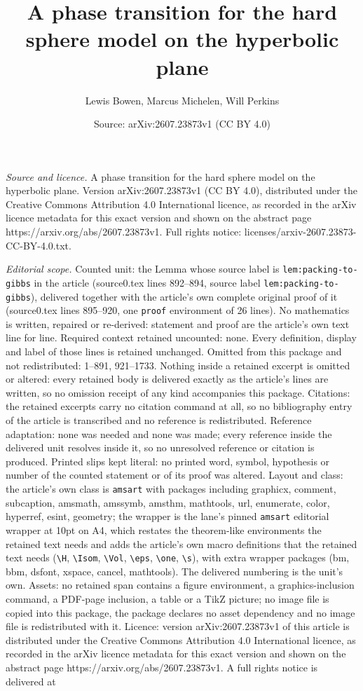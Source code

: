\documentclass[10pt,a4paper]{amsart}
\title[A phase transition for the hard sphere model on the hyperbol]{A phase transition for the hard sphere model on the hyperbolic plane}
\author{Lewis Bowen, Marcus Michelen, Will Perkins}
\date{Source: arXiv:2607.23873v1 (CC BY 4.0)}
\begin{document}
\maketitle

\noindent\emph{Source and licence.} A phase transition for the hard sphere model on the hyperbolic plane. Version arXiv:2607.23873v1 (CC BY 4.0), distributed under the Creative Commons Attribution 4.0 International licence, as recorded in the arXiv licence metadata for this exact version and shown on the abstract page https://arxiv.org/abs/2607.23873v1. Full rights notice: licenses/arxiv-2607.23873-CC-BY-4.0.txt.\par\smallskip

\noindent\textit{Editorial scope.} Counted unit: the Lemma whose source label is \texttt{lem:packing-to-gibbs} in the article (source0.tex lines 892--894, source label \texttt{lem:packing-to-gibbs}), delivered together with the article's own complete original proof of it (source0.tex lines 895--920, one \texttt{proof} environment of 26 lines). No mathematics is written, repaired or re-derived: statement and proof are the article's own text line for line. Required context retained uncounted: none. Every definition, display and label of those lines is retained unchanged. Omitted from this package and not redistributed: 1--891, 921--1733. Nothing inside a retained excerpt is omitted or altered: every retained body is delivered exactly as the article's lines are written, so no omission receipt of any kind accompanies this package. Citations: the retained excerpts carry no citation command at all, so no bibliography entry of the article is transcribed and no reference is redistributed. Reference adaptation: none was needed and none was made; every reference inside the delivered unit resolves inside it, so no unresolved reference or citation is produced. Printed slips kept literal: no printed word, symbol, hypothesis or number of the counted statement or of its proof was altered. Layout and class: the article's own class is \texttt{amsart} with packages including graphicx, comment, subcaption, amsmath, amssymb, amsthm, mathtools, url, enumerate, color, hyperref, esint, geometry; the wrapper is the lane's pinned \texttt{amsart} editorial wrapper at 10pt on A4, which restates the theorem-like environments the retained text needs and adds the article's own macro definitions that the retained text needs (\texttt{\textbackslash H}, \texttt{\textbackslash Isom}, \texttt{\textbackslash Vol}, \texttt{\textbackslash eps}, \texttt{\textbackslash one}, \texttt{\textbackslash s}), with extra wrapper packages (bm, bbm, dsfont, xspace, cancel, mathtools). The delivered numbering is the unit's own. Assets: no retained span contains a figure environment, a graphics-inclusion command, a PDF-page inclusion, a table or a TikZ picture; no image file is copied into this package, the package declares no asset dependency and no image file is redistributed with it. Licence: version arXiv:2607.23873v1 of this article is distributed under the Creative Commons Attribution 4.0 International licence, as recorded in the arXiv licence metadata for this exact version and shown on the abstract page https://arxiv.org/abs/2607.23873v1. A full rights notice is delivered at 
\end{document}
